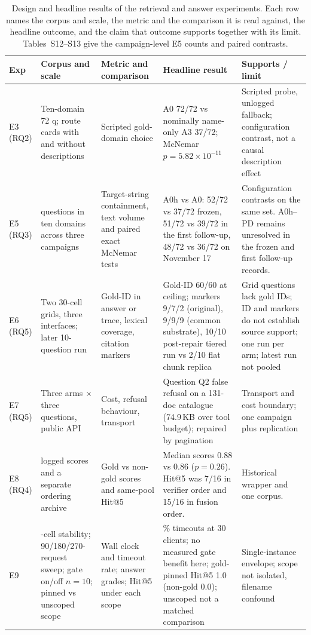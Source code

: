 \documentclass[final,5p,times,twocolumn]{elsarticle}
\begin{document}
\begin{table}[t]
\centering
\footnotesize
\setlength{\tabcolsep}{4pt}
\caption{Design and headline results of the retrieval and answer experiments.
Each row names the corpus and scale, the metric and the comparison it is read
against, the headline outcome, and the claim that outcome supports together
with its limit. Tables~S12--S13 give the campaign-level E5 counts and paired
contrasts.}
\label{tab:retrieval-design}
\begin{tabular}{@{}>{\raggedright\arraybackslash}p{}>{\raggedright\arraybackslash}p{}>{\raggedright\arraybackslash}p{}>{\raggedright\arraybackslash}p{}>{\raggedright\arraybackslash}p{}@{}}
\toprule
Exp & Corpus and scale & Metric and comparison & Headline result & Supports / limit\\
\midrule
E3 (RQ2) & Ten-domain 72 q; route cards with and without descriptions & Scripted gold-domain choice & A0 72/72 vs nominally name-only A3 37/72; McNemar $p=5.82\times10^{-11}$ & Scripted probe, unlogged fallback; configuration contrast, not a causal description effect\\
E5 (RQ3) & 72 questions in ten domains across three campaigns & Target-string containment, text volume and paired exact McNemar tests & A0h vs A0: 52/72 vs 37/72 frozen, 51/72 vs 39/72 in the first follow-up, 48/72 vs 36/72 on November 17 & Configuration contrasts on the same set. A0h--PD remains unresolved in the frozen and first follow-up records.\\
E6 (RQ5) & Two 30-cell grids, three interfaces; later 10-question run & Gold-ID in answer or trace, lexical coverage, citation markers & Gold-ID 60/60 at ceiling; markers 9/7/2 (original), 9/9/9 (common substrate), 10/10 post-repair tiered run vs 2/10 flat chunk replica & Grid questions lack gold IDs; ID and markers do not establish source support; one run per arm; latest run not pooled\\
E7 (RQ5) & Three arms $\times$ three questions, public API & Cost, refusal behaviour, transport & Question Q2 false refusal on a 131-doc catalogue (74.9\,KB over tool budget); repaired by pagination & Transport and cost boundary; one campaign plus replication\\
E8 (RQ4) & 191 logged scores and a separate ordering archive & Gold vs non-gold scores and same-pool Hit@5 & Median scores 0.88 vs 0.86 ($p=0.26$). Hit@5 was 7/16 in verifier order and 15/16 in fusion order. & Historical wrapper and one corpus.\\
E9 & 27-cell stability; 90/180/270-request sweep; gate on/off $n=10$; pinned vs unscoped scope & Wall clock and timeout rate; answer grades; Hit@5 under each scope & 41\% timeouts at 30 clients; no measured gate benefit here; gold-pinned Hit@5 1.0 (non-gold 0.0); unscoped not a matched comparison & Single-instance envelope; scope not isolated, filename confound\\
\bottomrule
\end{tabular}
\end{table}
\end{document}
